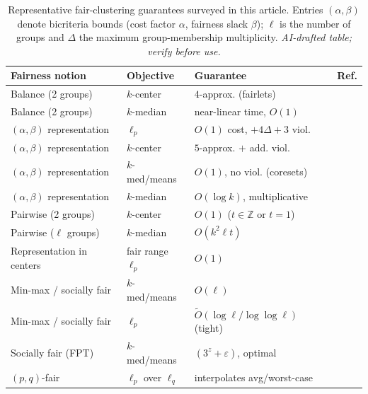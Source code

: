 \begin{table}[t]\centering\footnotesize
\caption{Representative fair-clustering guarantees surveyed in this article. Entries $(\alpha,\beta)$ denote bicriteria bounds (cost factor $\alpha$, fairness slack $\beta$); $\ell$ is the number of groups and $\Delta$ the maximum group-membership multiplicity. \emph{AI-drafted table; verify before use.}}\label{tab:results}
\renewcommand{\arraystretch}{1.15}
\begin{tabular}{@{}p{3.5cm}p{2.2cm}p{4.6cm}l@{}}
\toprule
\textbf{Fairness notion} & \textbf{Objective} & \textbf{Guarantee} & \textbf{Ref.}\\
\midrule
Balance (2 groups) & $k$-center & $4$-approx. (fairlets) & \citep{DBLP:conf/nips/Chierichetti0LV17}\\
Balance (2 groups) & $k$-median & near-linear time, $O(1)$ & \citep{backurs2019scalable}\\
$(\alpha,\beta)$ representation & $\ell_p$ & $O(1)$ cost, $+4\Delta{+}3$ viol. & \citep{bera2019fair}\\
$(\alpha,\beta)$ representation & $k$-center & $5$-approx. $+$ add. viol. & \citep{DBLP:conf/nips/HarbL20}\\
$(\alpha,\beta)$ representation & $k$-med/means & $O(1)$, no viol. (coresets) & \citep{DBLP:conf/icalp/BandyapadhyayFS21}\\
$(\alpha,\beta)$ representation & $k$-median & $O(\log k)$, multiplicative & \citep{DBLP:conf/fat/DaiMV22}\\
Pairwise (2 groups) & $k$-center & $O(1)$ ($t\in\mathbb{Z}$ or $t{=}1$) & \citep{bandyapadhyay2025constant}\\
Pairwise ($\ell$ groups) & $k$-median & $O(k^2\ell t)$ & \citep{bandyapadhyay2024polynomial}\\
Representation in centers & fair range $\ell_p$ & $O(1)$ & \citep{hotegni2023approximation,nguyen2022fair}\\
Min-max / socially fair & $k$-med/means & $O(\ell)$ & \citep{abbasi2021fair,ghadiri2021socially}\\
Min-max / socially fair & $\ell_p$ & $\tilde{O}(\log\ell/\log\log\ell)$ (tight) & \citep{makarychev2021approximation}\\
Socially fair (FPT) & $k$-med/means & $(3^z{+}\varepsilon)$, optimal & \citep{DBLP:journals/ipl/GoyalJ23}\\
$(p,q)$-fair & $\ell_p$ over $\ell_q$ & interpolates avg/worst-case & \citep{DBLP:conf/soda/ChlamtacMV22}\\

\end{tabular}
\end{table}
